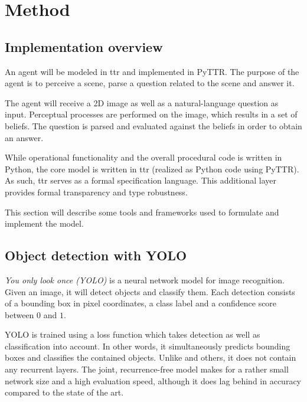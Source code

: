 \section{Method}
\label{sec:method}



\subsection{Implementation overview}
\label{sec:imploverview}

An agent will be modeled in \gls{ttr} and implemented in PyTTR.
The purpose of the agent is to perceive a scene, parse a question related to the scene and answer it.

The agent will receive a 2D image as well as a natural-language question as input.
Perceptual processes are performed on the image, which results in a set of beliefs.
The question is parsed and evaluated against the beliefs in order to obtain an answer.

While operational functionality and the overall procedural code is written in Python, the core model is written in \gls{ttr} (realized as Python code using PyTTR).
As such, \gls{ttr} serves as a formal specification language.
This additional layer provides formal transparency and type robustness.

This section will describe some tools and frameworks used to formulate and implement the model.



\subsection{Object detection with YOLO}

\textit{You only look once (YOLO)} \citep{RedmonYouOnlyLook2015} is a neural network model for image recognition.
Given an image, it will detect objects and classify them.
Each detection consists of a bounding box in pixel coordinates, a class label and a confidence score between $0$ and $1$.

YOLO is trained using a loss function which takes detection as well as classification into account.
In other words, it simultaneously predicts bounding boxes and classifies the contained objects.
Unlike \cite{HeMaskRCNN2017} and others, it does not contain any recurrent layers.
The joint, recurrence-free model makes for a rather small network size and a high evaluation speed, although it does lag behind in accuracy compared to the state of the art.

